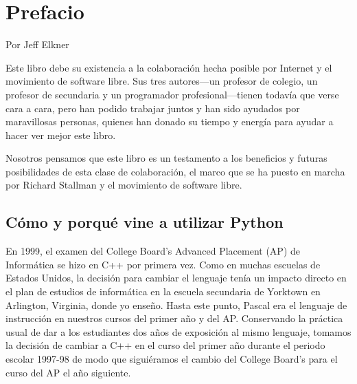 

%
\chapter{Prefacio}

Por Jeff Elkner

Este libro debe su existencia a la colaboración hecha posible por 
Internet y el movimiento de software libre.  Sus tres autores---un profesor de
colegio, un profesor de secundaria y un programador profesional---tienen
todavía que verse cara a cara, pero han podido trabajar juntos y han
sido ayudados por maravillosas personas, quienes han donado su tiempo y
energía para ayudar a hacer ver mejor este libro.

Nosotros pensamos que este libro es un testamento a los beneficios y futuras
posibilidades de esta clase de colaboración, el marco que se
ha puesto en marcha por Richard Stallman y el movimiento de software libre.


\section*{Cómo y porqué vine a utilizar Python}

En 1999, el examen del College Board's Advanced Placement (AP) de
Informática se hizo en C++ por primera vez.  Como en muchas escuelas
de Estados Unidos, la decisión para cambiar el lenguaje tenía
un impacto directo en el plan de estudios de informática en la
escuela secundaria de Yorktown en Arlington, Virginia, donde yo enseño.  Hasta
este punto, Pascal era el lenguaje de instrucción en nuestros cursos del
primer año y del AP.  Conservando la práctica usual de dar a los estudiantes
dos años de exposición al mismo lenguaje, tomamos la decisión de
cambiar a C++ en el curso del primer año durante el periodo escolar 1997-98 de
modo que siguiéramos el cambio del College Board's para el curso del AP el año
 siguiente.

